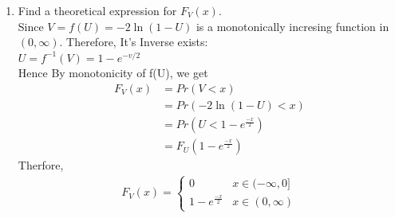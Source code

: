 \documentclass[journal,12pt,twocolumn]{IEEEtran}
\renewcommand\thesection{\arabic{section}}
\begin{document}
\begin{enumerate}[label=\thesection.\arabic*.,ref=\thesection.\theenumi]
\item Find a theoretical expression for $F_V (x)$.\\
\solution 
    Since $V=f(U) = -2\ln(1-U)$ is a monotonically incresing function in $(0,\infty)$. Therefore, It's Inverse exists:
    \\ $U=f^{-1}(V) = 1-e^{-v/2}$\\
    Hence By monotonicity of f(U), we get
    \begin{align}
        F_V(x) &= Pr(V<x)\\
        &= Pr(-2\ln(1-U) < x)\\
        &= Pr(U<1-e^{\frac{-x}{2}}) \\
        &= F_U(1-e^{\frac{-x}{2}})
    \end{align}
    Therfore,
    \begin{align}
        F_V(x) = \begin{cases}
        0 & x \in (-\infty,0] \\
        1-e^{\frac{-x}{2}} & x \in (0,\infty)
    \end{cases} 
    \end{align}
\end{enumerate}
\end{document}
